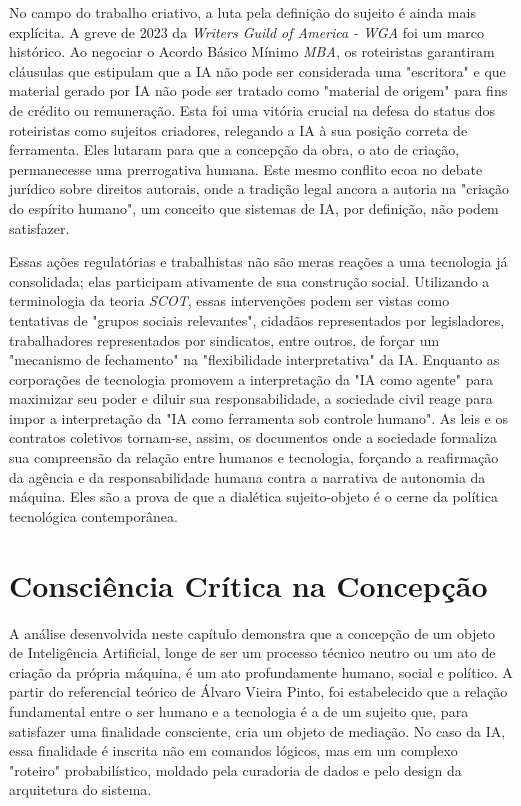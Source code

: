 No campo do trabalho criativo, a luta pela definição do sujeito é ainda mais explícita. A greve de 2023 da \textit{Writers Guild of America - WGA} foi um marco histórico. Ao 
negociar o Acordo Básico Mínimo \textit{MBA}, os roteiristas garantiram cláusulas que estipulam que a IA não pode ser considerada uma "escritora" e que material gerado por IA 
não pode ser tratado como "material de origem" para fins de crédito ou remuneração. Esta foi uma vitória crucial na defesa do status dos roteiristas como sujeitos criadores, 
relegando a IA à sua posição correta de ferramenta. Eles lutaram para que a concepção da obra, o ato de criação, permanecesse uma prerrogativa humana. Este mesmo conflito ecoa 
no debate jurídico sobre direitos autorais, onde a tradição legal ancora a autoria na "criação do espírito humano", um conceito que sistemas de IA, por definição, não podem 
satisfazer.   

Essas ações regulatórias e trabalhistas não são meras reações a uma tecnologia já consolidada; elas participam ativamente de sua construção social. Utilizando a terminologia da 
teoria \textit{SCOT}, essas intervenções podem ser vistas como tentativas de "grupos sociais relevantes", cidadãos representados por legisladores, trabalhadores representados por 
sindicatos, entre outros, de forçar um "mecanismo de fechamento" na "flexibilidade interpretativa" da IA. Enquanto as corporações de tecnologia promovem a interpretação da 
"IA como agente" para maximizar seu poder e diluir sua responsabilidade, a sociedade civil reage para impor a interpretação da "IA como ferramenta sob controle humano". As leis 
e os contratos coletivos tornam-se, assim, os documentos onde a sociedade formaliza sua compreensão da relação entre humanos e tecnologia, forçando a reafirmação da agência e da 
responsabilidade humana contra a narrativa de autonomia da máquina. Eles são a prova de que a dialética sujeito-objeto é o cerne da política tecnológica contemporânea.

\section{Consciência Crítica na Concepção}\label{sec:consciencia_critica_concepcao}

A análise desenvolvida neste capítulo demonstra que a concepção de um objeto de Inteligência Artificial, longe de ser um processo técnico neutro ou um ato de criação da própria 
máquina, é um ato profundamente humano, social e político. A partir do referencial teórico de Álvaro Vieira Pinto, foi estabelecido que a relação fundamental entre o ser humano 
e a tecnologia é a de um sujeito que, para satisfazer uma finalidade consciente, cria um objeto de mediação. No caso da IA, essa finalidade é inscrita não em comandos lógicos, 
mas em um complexo "roteiro" probabilístico, moldado pela curadoria de dados e pelo design da arquitetura do sistema.


